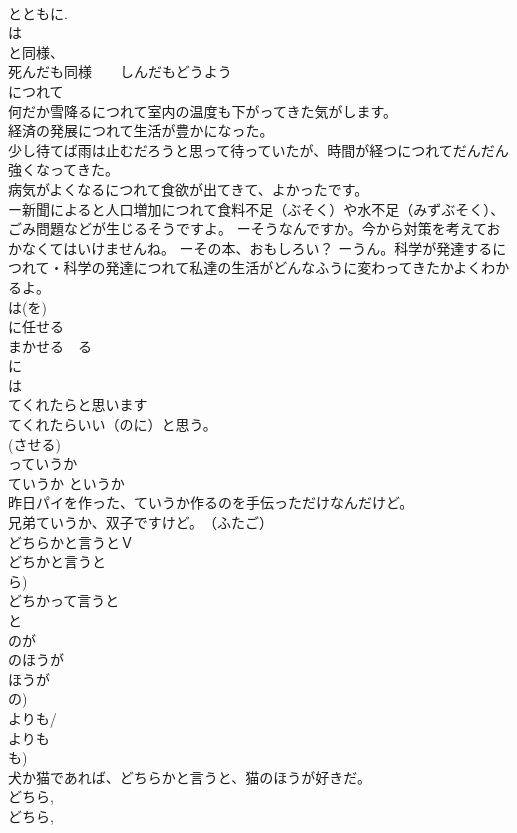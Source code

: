 \documentclass[8pt]{extreport}
\begin{document}
\begin{CJK}{UTF8}{min}
\\	とともに. 
\\	は
\\	と同様、
\\	死んだも同様　　しんだもどうよう 
\\	につれて 
\\	何だか雪降るにつれて室内の温度も下がってきた気がします。 
\\	経済の発展につれて生活が豊かになった。 
\\	少し待てば雨は止むだろうと思って待っていたが、時間が経つにつれてだんだん強くなってきた。 
\\	病気がよくなるにつれて食欲が出てきて、よかったです。 
\\	ー新聞によると人口増加につれて食料不足（ぶそく）や水不足（みずぶそく）、ごみ問題などが生じるそうですよ。 ーそうなんですか。今から対策を考えておかなくてはいけませんね。 ーその本、おもしろい？ ーうん。科学が発達するにつれて・科学の発達につれて私達の生活がどんなふうに変わってきたかよくわかるよ。
\\	は(を)
\\	に任せる	
\\	まかせる　る
\\	に 
\\	は 
\\	てくれたらと思います	
\\	てくれたらいい（のに）と思う。 
\\	(させる) 
\\	っていうか
\\	ていうか というか 
\\	昨日パイを作った、ていうか作るのを手伝っただけなんだけど。 
\\	兄弟ていうか、双子ですけど。　（ふたご） 
\\	どちらかと言うとＶ	
\\	どちかと言うと　
\\	ら) 
\\	どちかって言うと 
\\	と 
\\	のが
\\	のほうが
\\	ほうが
\\	の) 
\\	よりも/
\\	よりも 
\\	も) 
\\	犬か猫であれば、どちらかと言うと、猫のほうが好きだ。 
\\	どちら, 
\\	どちら, 

\end{CJK}
\end{document}
